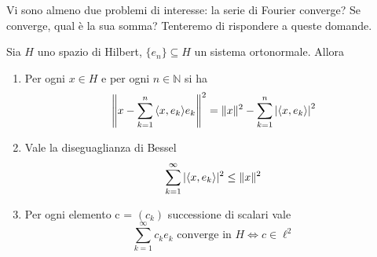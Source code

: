 Vi sono almeno due problemi di interesse: la serie di Fourier converge? Se
converge, qual è la sua somma? Tenteremo di rispondere a queste domande.
\begin{proposition}\label{prop:bessel}
    Sia \(H\) uno spazio di Hilbert, \(\{e_{n}\} \subseteq H \) un sistema
    ortonormale. Allora
\begin{enumerate}[label = \arabic*.]
    \item Per ogni \(x \in H\) e per ogni \(n \in \mathbb{N}\) si ha
        \begin{equation}\label{eq:bessel1}
          \left\|x - \sum_{k=1}^{n} {\left\langle x, e_{k}\right\rangle} e_{k} \right\|^2 =
          \|x\|^2 - \sum_{k=1}^{n} \left| {\left\langle x, e_{k}\right\rangle}  \right|^2 
        \end{equation}
    \item Vale la diseguaglianza di Bessel
        \begin{equation}\label{eq:bessel}
          \sum_{k=1}^{\infty} |{\left\langle x, e_{k}\right\rangle} |^2 \le \|x\|^2 
        \end{equation}
    \item Per ogni elemento c = \({(c_{k})}\) successione di scalari vale
        \begin{equation}\label{eq:bessel3}
            \sum_{k=1}^{\infty} c_{k} e_{k} \text{ converge in } H \iff c \in
            \ell^2
        \end{equation}
\end{enumerate}
\end{proposition}
